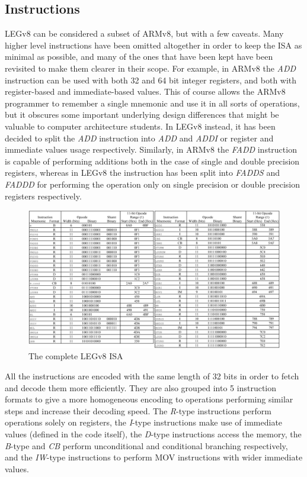 \subsection*{Instructions}
LEGv8 can be considered a subset of ARMv8, but with a few caveats. Many higher level instructions have been omitted altogether in order to keep the ISA as minimal as possible, and many of the ones that have been kept have been revisited to make them clearer in their scope. For example, in ARMv8 the \emph{ADD} instruction can be used with both 32 and 64 bit integer registers, and both with register-based and immediate-based values. This of course allows the ARMv8 programmer to remember a single mnemonic and use it in all sorts of operations, but it obscures some important underlying design differences that might be valuable to computer architecture students. In LEGv8 instead, it has been decided to split the \emph{ADD} instruction into \emph{ADD} and \emph{ADDI} or register and immediate values usage respectively. Similarly, in ARMv8 the \emph{FADD} instruction is capable of performing additions both in the case of single and double precision registers, whereas in LEGv8 the instruction has been split into \emph{FADDS} and \emph{FADDD} for performing the operation only on single precision or double precision registers respectively.
\begin{figure}[H]
	\centering
	\includegraphics[width=.8\textwidth]{img/legv8_instruction_set.png}
	\caption{The complete LEGv8 ISA}
\end{figure}
All the instructions are encoded with the same length of 32 bits in order to fetch and decode them more efficiently. They are also grouped into 5 instruction formats to give a more homogeneous encoding to operations performing similar steps and increase their decoding speed.
The \emph{R}-type instructions perform operations solely on registers, the \emph{I}-type instructions make use of immediate values (defined in the code itself), the \emph{D}-type instructions access the memory, the \emph{B}-type and \emph{CB} perform unconditional and conditional branching respectively, and the \emph{IW}-type instructions to perform MOV instructions with wider immediate values.
